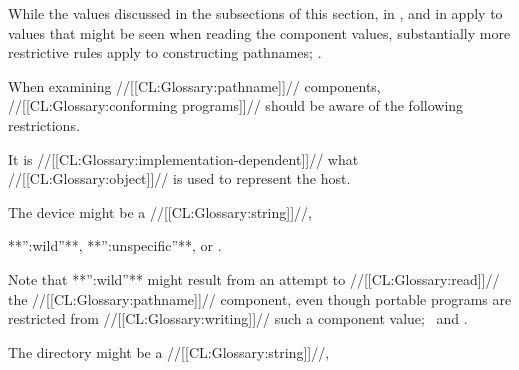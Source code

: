 While the values discussed 
    in the subsections of this section,
    in {\secref\SpecialComponentValues},
and in {\secref\WildcardRestrictions} 
apply to values that might be seen when 
reading the component values,
substantially more restrictive rules apply to constructing pathnames;
\seesection\ConstructingPathnames.

When examining //[[CL:Glossary:pathname]]// components,
//[[CL:Glossary:conforming programs]]// should be aware of the following restrictions.






























It is //[[CL:Glossary:implementation-dependent]]// what //[[CL:Glossary:object]]// is used to represent the host. 

\endsubsubsubsection%




The device might be a //[[CL:Glossary:string]]//,

**'':wild''**, **'':unspecific''**, or \nil.

Note that **'':wild''** might result from an attempt to //[[CL:Glossary:read]]//
the //[[CL:Glossary:pathname]]// component, even though portable programs are restricted
from //[[CL:Glossary:writing]]// such a component value; 
\seesection\WildcardRestrictions\ and \secref\ConstructingPathnames.

\endsubsubsubsection%




The directory might be a //[[CL:Glossary:string]]//,







